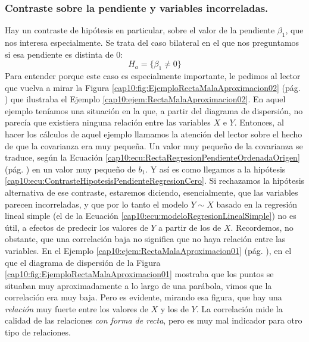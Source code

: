 \subsubsection*{Contraste sobre la pendiente y variables incorreladas.}
\label{cap10:subsubsec:ContrasteHipotesisPendienteVariablesIncorreladas}

Hay un contraste de hipótesis en particular, sobre el valor de la pendiente $\beta_1$, que nos interesa especialmente. Se trata del caso bilateral en el que nos preguntamos si esa pendiente es distinta de $0$:
    \begin{equation}\label{cap10:ecu:ContrasteHipotesisPendienteRegresionCero}
    H_a=\{\beta_1\neq 0\}
    \end{equation}
Para entender porque este caso es especialmente importante, le pedimos al lector que vuelva a mirar la Figura \ref{cap10:fig:EjemploRectaMalaAproximacion02} (pág. \pageref{cap10:fig:EjemploRectaMalaAproximacion02}) que ilustraba el Ejemplo \ref{cap10:ejem:RectaMalaAproximacion02}. En aquel ejemplo teníamos una situación en la que, a partir del diagrama de dispersión, no parecía que existiera ninguna relación entre las variables $X$ e $Y$. Entonces, al hacer los cálculos de aquel ejemplo llamamos la atención del lector sobre el hecho de que la covarianza era muy pequeña. Un valor muy pequeño de la covarianza se traduce, según la Ecuación \ref{cap10:ecu:RectaRegresionPendienteOrdenadaOrigen} (pág. \pageref{cap10:ecu:RectaRegresionPendienteOrdenadaOrigen}) en un valor muy pequeño de $b_1$. Y así es como llegamos a la hipótesis \ref{cap10:ecu:ContrasteHipotesisPendienteRegresionCero}. Si rechazamos la hipótesis alternativa de ese contraste, estaremos diciendo, esencialmente, que las variables parecen incorreladas, y que por lo tanto el modelo $Y \sim X$ basado en la regresión lineal simple (el de la Ecuación \ref{cap10:ecu:modeloRegresionLinealSimple}) no es útil, a efectos de predecir los valores de $Y$ a partir de los de $X$. Recordemos, no obstante, que una correlación baja no significa que no haya relación entre las variables. En el Ejemplo \ref{cap10:ejem:RectaMalaAproximacion01} (pág. \pageref{cap10:ejem:RectaMalaAproximacion01}), en el que el diagrama de dispersión de la Figura \ref{cap10:fig:EjemploRectaMalaAproximacion01} mostraba que los puntos se situaban muy aproximadamente a lo largo de una parábola, vimos que la correlación era muy baja. Pero es evidente, mirando esa figura, que hay una {\em relación} muy fuerte entre los valores de $X$ y los de $Y$. La correlación mide la calidad de las relaciones {\em con forma de recta}, pero es muy mal indicador para otro tipo de relaciones.

